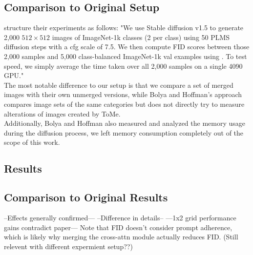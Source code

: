 \newpage
\subsection{Comparison to Original Setup}
\cite{bolya2023tomesd} structure their experiments as follows: "We use Stable diffusion v1.5 to generate 2,000 $512 \times 512$ images of ImageNet-1k \cite{deng2009imagenet} classes (2 per class) using 50 PLMS \cite{liu2022pseudo} diffusion steps with a cfg scale \cite{dhariwal2021diffusion} of 7.5. We then compute FID scores between those 2,000 samples and 5,000 class-balanced ImageNet-1k val examples using \cite{Seitzer2020FID}. To test speed, we simply average the time taken over all 2,000 samples on a single 4090 GPU."\\
The most notable difference to our setup is that we compare a set of merged images with their own unmerged versions, while Bolya and Hoffman's approach compares image sets of the same categories but does not directly try to measure alterations of images created by ToMe.\\
Additionally, Bolya and Hoffman also measured and analyzed the memory usage during the diffusion process, we left memory consumption completely out of the scope of this work.



\subsection{Results}




\subsection{Comparison to Original Results}
--Effects generally confirmed---
--Difference in details--
---1x2 grid performance gains contradict paper---
Note that FID doesn’t consider prompt adherence, which is likely why merging the cross-attn module actually reduces FID. (Still relevent with different expermient setup??)